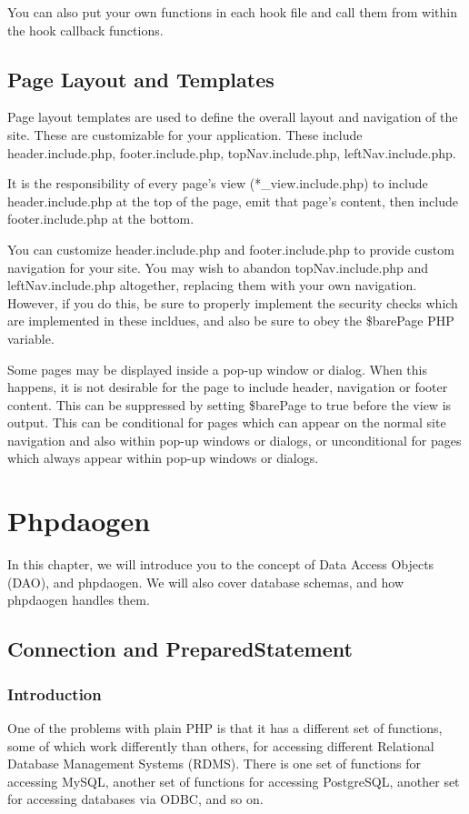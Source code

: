 \documentclass[letterpaper,10pt,english]{sphinxmanual}
\begin{document}
You can also put your own functions in each hook file and call them from within the hook callback
functions.


\section{Page Layout and Templates}
\label{jaxFrameworkGuide:page-layout-and-templates}
Page layout templates are used to define the overall layout and navigation of the site.  These are
customizable for your application.  These include header.include.php, footer.include.php,
topNav.include.php, leftNav.include.php.

It is the responsibility of every page's view (*\_view.include.php) to include header.include.php at
the top of the page, emit that page's content, then include footer.include.php at the bottom.

You can customize header.include.php and footer.include.php to provide custom navigation for your
site.  You may wish to abandon topNav.include.php and leftNav.include.php altogether, replacing them
with your own navigation.  However, if you do this, be sure to properly implement the security
checks which are implemented in these incldues, and also be sure to obey the \$barePage PHP variable.

Some pages may be displayed inside a pop-up window or dialog.  When this happens, it is not
desirable for the page to include header, navigation or footer content.  This can be suppressed by
setting \$barePage to true before the view is output.  This can be conditional for pages which can
appear on the normal site navigation and also within pop-up windows or dialogs, or unconditional for
pages which always appear within pop-up windows or dialogs.


\chapter{Phpdaogen}
\label{jaxFrameworkGuide:id12}
In this chapter, we will introduce you to the concept of Data Access Objects (DAO), and phpdaogen.
We will also cover database schemas, and how phpdaogen handles them.


\section{Connection and PreparedStatement}
\label{jaxFrameworkGuide:connection-and-preparedstatement}

\subsection{Introduction}
\label{jaxFrameworkGuide:id13}
One of the problems with plain PHP is that it has a different set of functions, some of which work
differently than others, for accessing different Relational Database Management Systems (RDMS).
There is one set of functions for accessing MySQL, another set of functions for accessing
PostgreSQL, another set for accessing databases via ODBC, and so on.
\end{document}
